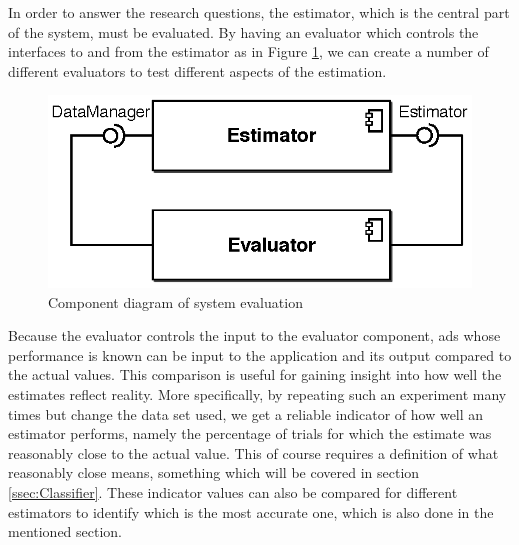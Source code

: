 \documentclass{sig-alternate}
\begin{document}
In order to answer the research questions, the estimator, which is the central part of the system, must be evaluated. By having an evaluator which controls the interfaces to and from the estimator as in Figure \ref{fig:SWEvaluator}, we can create a number of different evaluators to test different aspects of the estimation.

\begin{figure}[htb]
	\centering
	\includegraphics[width=0.65\columnwidth]{sw-evaluator.eps}
	\caption{Component diagram of system evaluation}
	\label{fig:SWEvaluator}
\end{figure}

Because the evaluator controls the input to the evaluator component, ads whose performance is known can be input to the application and its output compared to the actual values. This comparison is useful for gaining insight into how well the estimates reflect reality. More specifically, by repeating such an experiment many times but change the data set used, we get a reliable indicator of how well an estimator performs, namely the percentage of trials for which the estimate was reasonably close to the actual value. This of course requires a definition of what reasonably close means, something which will be covered in section \ref{ssec:Classifier}. These indicator values can also be compared for different estimators to identify which is the most accurate one, which is also done in the mentioned section.
\end{document}
